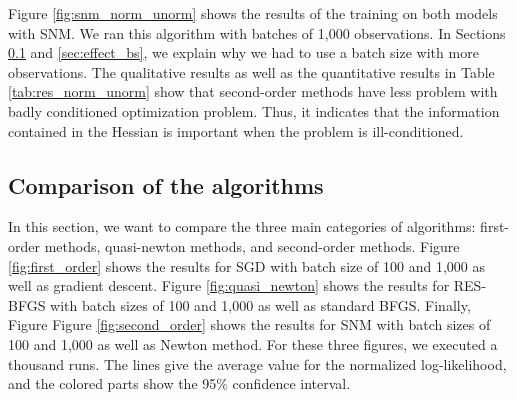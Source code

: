 \documentclass[conference]{IEEEtran}
\begin{document}
Figure \ref{fig:snm_norm_unorm} shows the results of the training on both models with SNM. We ran this algorithm with batches of 1,000 observations. In Sections \ref{sec:comp_algo} and \ref{sec:effect_bs}, we explain why we had to use a batch size with more observations. The qualitative results as well as the quantitative results in Table \ref{tab:res_norm_unorm} show that second-order methods have less problem with badly conditioned optimization problem. Thus, it indicates that the information contained in the Hessian is important when the problem is ill-conditioned.

\subsection{Comparison of the algorithms}
\label{sec:comp_algo}

In this section, we want to compare the three main categories of algorithms: first-order methods, quasi-newton methods, and second-order methods. Figure \ref{fig:first_order} shows the results for SGD with batch size of 100 and 1,000 as well as gradient descent. Figure \ref{fig:quasi_newton} shows the results for RES-BFGS with batch sizes of 100 and 1,000 as well as standard BFGS. Finally,  Figure Figure \ref{fig:second_order} shows the results for SNM with batch sizes of 100 and 1,000 as well as Newton method. For these three figures, we executed a thousand runs. The lines give the average value for the normalized log-likelihood, and the colored parts show the 95\% confidence interval.\\
\end{document}

